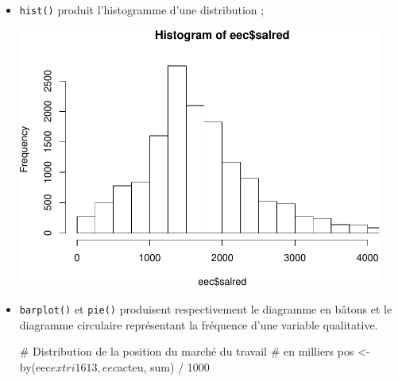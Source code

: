\documentclass[12pt,twosided, notitlepage]{book}
\newenvironment{Shaded}{}{}
\newcommand{\KeywordTok}[1]{\textcolor[rgb]{0.00,0.00,1.00}{#1}}
\newcommand{\DataTypeTok}[1]{#1}
\newcommand{\DecValTok}[1]{#1}
\newcommand{\StringTok}[1]{\textcolor[rgb]{0.00,0.50,0.50}{#1}}
\newcommand{\CommentTok}[1]{\textcolor[rgb]{0.00,0.50,0.00}{#1}}
\newcommand{\OperatorTok}[1]{#1}
\newcommand{\NormalTok}[1]{#1}
\renewenvironment{Shaded}{\begin{snugshade}}{\end{snugshade}}
\begin{document}
\begin{itemize}
\item
  \texttt{hist()} produit l'histogramme
  d'une distribution ;

\begin{Shaded}
\end{Shaded}

  \begin{center}\includegraphics[width=12cm]{livret_files/figure-latex/unnamed-chunk-442-1} \end{center}
\item
  \texttt{barplot()} et
  \texttt{pie()} produisent respectivement le
  diagramme en bâtons et le diagramme circulaire représentant la
  fréquence d'une variable qualitative.

\begin{Shaded}
\begin{Highlighting}[]
\CommentTok{# Distribution de la position du marché du travail}
\CommentTok{# en milliers}
\NormalTok{pos <-}\StringTok{ }\KeywordTok{by}\NormalTok{(eec}\OperatorTok{$}\NormalTok{extri1613, eec}\OperatorTok{$}\NormalTok{acteu, sum) }\OperatorTok{/}\StringTok{ }\DecValTok{1000}


\end{Highlighting}
\end{Shaded}
\end{itemize}
\end{document}
